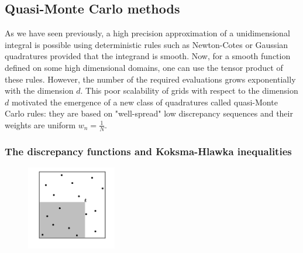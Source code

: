 \documentclass[twoside,11pt]{book}
\begin{document}
\subsection{Quasi-Monte Carlo methods}
As we have seen previously, a high precision approximation of a unidimensional integral  is possible using deterministic rules such as Newton-Cotes or Gaussian quadratures provided that the integrand is smooth. Now, for a smooth function defined on some high dimensional domains, one can use the tensor product of these rules. However, the number of the required evaluations grows exponentially with the dimension $d$. This poor scalability of grids with respect to the dimension $d$ motivated the emergence of a new class of quadratures called quasi-Monte Carlo rules: they are based on "well-spread" low discrepancy sequences and their weights are uniform $\displaystyle w_{n} = \frac{1}{N}$.










 
\subsubsection{The discrepancy functions and Koksma-Hlawka inequalities}

\begin{figure}
\centering
\includegraphics[width= 0.35\textwidth]{img/discrepancy/local_disc.png}
\caption{\label{fig:local_discrepancy}}
\end{figure}
\end{document}
